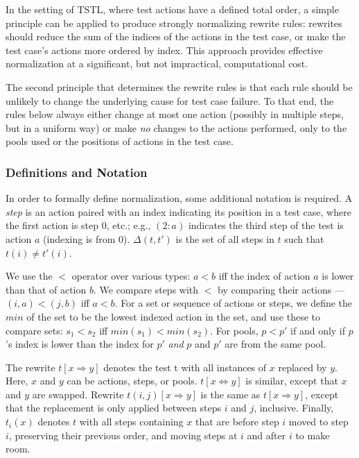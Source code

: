 In the setting of TSTL, where test actions have a defined total
order, a simple principle can be applied to produce strongly
normalizing rewrite rules: rewrites should reduce the sum of the
indices of the actions in the test case, or make the test case's
actions more ordered by index.  This approach
provides effective normalization at a significant, but not
impractical, computational cost.

The second principle that determines the rewrite rules is that each
rule should be unlikely to change the underlying cause for test case
failure.  To that end, the rules below always either change at most
one action (possibly in multiple steps, but in a uniform way) or make
\emph{no} changes to the actions performed, only to the pools used or the
positions of actions in the test case.

\subsubsection{Definitions and Notation}

In order to formally define normalization, some additional notation is required.
A \emph{step} is an action paired with an index indicating its
position in a test case,
where the first action is step 0, etc.; e.g., $(2: a)$ indicates the
third step of the test is action $a$ (indexing is from 0). 
$\Delta(t,t')$ is the set of all steps in $t$ such that $t(i) \not= t'(i)$.

We use the $<$ operator over various types:
$a < b$ iff the index of action $a$ is lower
than that of action $b$.  We compare steps with $<$ by comparing their
actions --- $(i,a) < (j,b)$ iff $a < b$.  For a set or sequence of actions or steps, we define the $min$ of the
set to be the lowest indexed action in the set, and use
these to compare sets:  $s_1 < s_2$ iff $min(s_1) < min(s_2)$. For pools,
$p < p'$ if and only if $p$'s index is lower than the index for $p'$
\emph{and} $p$ and $p'$ are from the same pool.

The rewrite $t[x \Rightarrow y]$ denotes the test t with all instances of $x$
replaced by $y$.  Here, $x$ and $y$ can be actions, steps, or pools.
$t[x \Leftrightarrow y]$ is similar, except that $x$ and $y$ are
swapped.  Rewrite $t(i,j)[x \Rightarrow y]$ is the same as $t[x \Rightarrow
y]$, except that the replacement is only applied between steps $i$ and
$j$, inclusive.  Finally, $t_i(x)$ denotes $t$ with all steps
containing $x$ that are before step $i$ moved to step $i$, preserving
their previous order, and moving steps at $i$ and after $i$ to make room.


